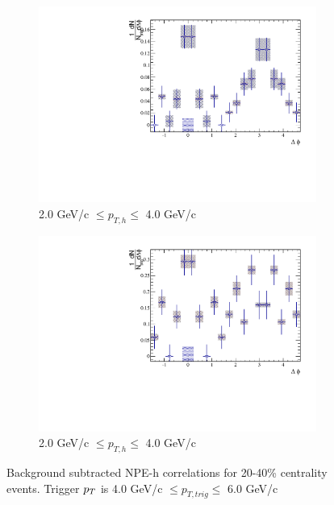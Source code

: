 \begin{figure}[htbp]
\begin{subfigure}{0.5\textwidth}
		\includegraphics[width=\textwidth]{Plots/Correlations/subtracted/NPE_eh_corr_subtracted_primpt_4_5_cent_4_5_assopt_3_4.pdf}
		\caption{2.0 GeV/c $\leq p_{T,h} \leq$ 4.0 GeV/c}
		\label{fig:Sub2040e}
	\end{subfigure}	
	\begin{subfigure}{0.5\textwidth}
		\includegraphics[width=\textwidth]{Plots/Correlations/subtracted/NPE_eh_corr_subtracted_primpt_6_8_cent_4_5_assopt_3_4.pdf}
		\caption{2.0 GeV/c $\leq p_{T,h} \leq$ 4.0 GeV/c}
		\label{fig:Sub2040f}
	\end{subfigure}	
\caption[Subtracted Correlations 20-40\% Centrality]{Background subtracted NPE-h correlations for 20-40\% centrality events. Trigger $p_{T}$ is 4.0 GeV/c $\leq p_{T,trig} \leq$ 6.0 GeV/c}
\label{fig:Sub2040}
\end{figure}

